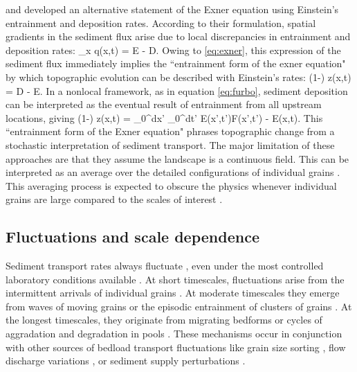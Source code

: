 \citet{Nakagawa1976} and \citet{Tsujimoto1978} developed an alternative statement of the Exner equation using Einstein's entrainment and deposition rates.
According to their formulation, spatial gradients in the sediment flux arise due to local discrepancies in entrainment and deposition rates:
\be \partial_x q(x,t) = E - D. \ee 
Owing to \ref{eq:exner}, this expression of the sediment flux immediately implies the ``entrainment form of the exner equation" \citep{Parker2000,Furbish2012,Fathel2015,Furbish2017} by which topographic evolution can be described with Einstein's rates: 
\be (1-\phi) \px z(x,t) = D - E.\ee
In a nonlocal framework, as in equation \ref{eq:furbo}, sediment deposition can be interpreted as the eventual result of entrainment from all upstream locations, giving
\be (1-\phi) \px z(x,t) = \int_0^\infty dx' \int_0^\infty dt' E(x',t')F(x',t') - E(x,t). \ee
This ``entrainment form of the Exner equation" \citep{Furbish2017} phrases topographic change from a stochastic interpretation of sediment transport.
The major limitation of these approaches are that they assume the landscape is a continuous field. This can be interpreted as an average over the detailed configurations of individual grains \citep{Coleman2009}. This averaging process is expected to obscure the physics whenever individual grains are large compared to the scales of interest \citep[e.g.][]{Shobe2021}.

\subsection{Fluctuations and scale dependence}

Sediment transport rates always fluctuate \citep{Kuhnle1988,Hoey1992,Recking2012}, even under the most controlled laboratory conditions available \citep{Ancey2006,Roseberry2012}.
At short timescales, fluctuations arise from the intermittent arrivals of individual grains \citep{Bohm2004,Ballio2018}. At moderate timescales they emerge from waves of moving grains \citep{Heyman2014} or the episodic entrainment of clusters of grains \citep{Strom2004,Papanicolaou2018}. At the longest timescales, they originate from migrating bedforms \citep{Guala2014} or cycles of aggradation and degradation in pools \citep{Dhont2018}. These mechanisms occur in conjunction with other sources of bedload transport fluctuations like grain size sorting \citep{Iseya1987,Cudden2003}, flow discharge variations \citep{Wong2006,Mao2012,Redolfi2018}, or sediment supply perturbations \citep{Lisle1993,Madej2009,Elgueta-Astaburuaga2019}.

